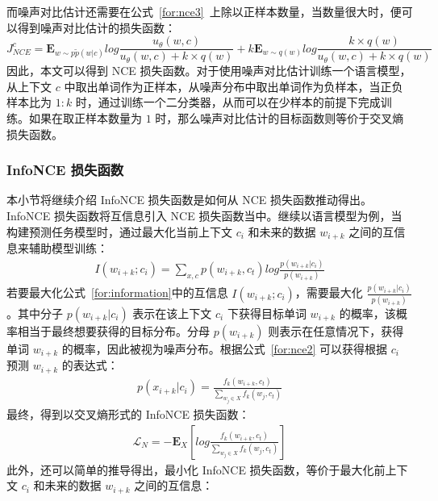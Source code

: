 而噪声对比估计还需要在公式~\ref{for:nce3}~上除以正样本数量，当数量很大时，便可以得到噪声对比估计的损失函数：
\begin{equation}
    J_{NCE}^c = \mathbf{E}_{w\sim p\tilde{p}(w|c)}log\frac{u_{\theta}(w,c)}{u_{\theta}(w,c) + k \times q(w)} + k\mathbf{E}_{w\sim q(w)}log\frac{k \times q(w)}{u_{\theta}(w,c) + k \times q(w)}
\end{equation}
因此，本文可以得到 NCE 损失函数。对于使用噪声对比估计训练一个语言模型，从上下文 $c$ 中取出单词作为正样本，从噪声分布中取出单词作为负样本，当正负样本比为 $1:k$ 时，通过训练一个二分类器，从而可以在少样本的前提下完成训练。如果在取正样本数量为 $1$ 时，那么噪声对比估计的目标函数则等价于交叉熵损失函数。

\subsubsection{InfoNCE 损失函数}
本小节将继续介绍 InfoNCE 损失函数是如何从 NCE 损失函数推动得出。InfoNCE 损失函数将互信息引入 NCE 损失函数当中\cite{oord_representation_2019}。继续以语言模型为例，当构建预测任务模型时，通过最大化当前上下文 $c_i$ 和未来的数据 $w_{i+k}$ 之间的互信息来辅助模型训练：
\begin{gather}
    I(w_{i+k};c_i)= \sum_{x,c} p(w_{i+k},c_t) log \frac{p(w_{i+k}|c_i)}{p(w_{i+k})} \label{for:information}
\end{gather}
若要最大化公式~\ref{for:information}中的互信息 $I(w_{i+k};c_i)$，需要最大化 $\frac{p(w_{i+k}|c_i)}{p(w_{i+k})}$。其中分子 $p(w_{i+k}|c_i)$ 表示在该上下文 $c_i$ 下获得目标单词 $w_{i+k}$ 的概率，该概率相当于最终想要获得的目标分布。分母 $p(w_{i+k})$ 则表示在任意情况下，获得单词 $w_{i+k}$ 的概率，因此被视为噪声分布。根据公式~\ref{for:nce2} 可以获得根据 $c_i$ 预测 $w_{i+k}$ 的表达式：
\begin{gather}
    p(x_{i+k}|c_i) = \frac{f_k(w_{i+k},c_t)}{\sum_{w_j \in X} f_k(w_j,c_t)}
\end{gather}
最终，得到以交叉熵形式的 InfoNCE 损失函数：
\begin{gather}
    \mathcal{L}_N = -\mathbf{E}_X [log \frac{f_k(w_{i+k},c_t)}{\sum_{w_j \in X} f_k(w_j,c_t)}]
\end{gather}
此外，还可以简单的推导得出，最小化 InfoNCE 损失函数，等价于最大化前上下文 $c_i$ 和未来的数据 $w_{i+k}$ 之间的互信息：
